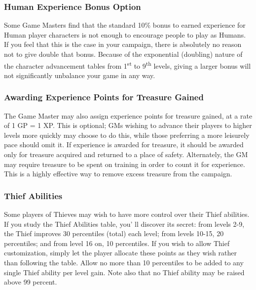 \documentclass[a4paper,twoside,openany,10pt]{book}
\begin{document}
\begin{multicols}{2}
\subsubsection{Human Experience Bonus Option}\label{human-experience-bonus-option}

Some Game Masters find that the standard 10\% bonus to earned experience for Human player characters is not enough to encourage people to play as Humans. If you feel that this is the case in your campaign, there is absolutely no reason not to give double that bonus. Because of the exponential (doubling) nature of the character advancement tables from 1\textsuperscript{st} to 9\textsuperscript{th} levels, giving a larger bonus will not significantly unbalance your game in any way.


\subsubsection{Awarding Experience Points for Treasure Gained}\label{awarding-experience-points-for-treasure-gained}

The Game Master may also assign experience points for treasure gained, at a rate of 1 GP = 1 XP. This is optional; GMs wishing to advance their players to higher levels more quickly may choose to do this, while those preferring a more leisurely pace should omit it. If experience is awarded for treasure, it should be awarded only for treasure acquired and returned to a place of safety. Alternately, the GM may require treasure to be spent on training in order to count it for experience. This is a highly effective way to remove excess treasure from the campaign.

\subsubsection{Thief Abilities}\label{thief-abilities-1}

Some players of Thieves may wish to have more control over their Thief abilities. If you study the Thief Abilities table, you' ll discover its secret: from levels 2-9, the Thief improves 30 percentiles (total) each level; from levels 10-15, 20 percentiles; and from level 16 on, 10 percentiles. If you wish to allow Thief customization, simply let the player allocate these points as they wish rather than following the table. Allow no more than 10 percentiles to be added to any single Thief ability per level gain. Note also that no Thief ability may be raised above 99 percent.


\end{multicols}
\end{document}
